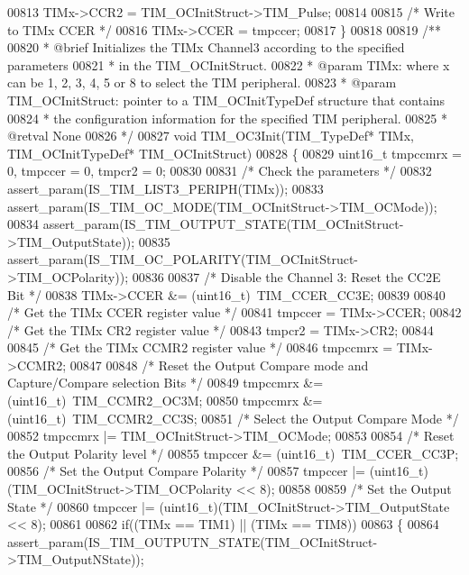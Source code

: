 \begin{DoxyCode}
00813   TIMx->CCR2 = TIM\_OCInitStruct->TIM\_Pulse;
00814 
00815   \textcolor{comment}{/* Write to TIMx CCER */}
00816   TIMx->CCER = tmpccer;
00817 \}
00818 
00819 \textcolor{comment}{/**}
00820 \textcolor{comment}{  * @brief  Initializes the TIMx Channel3 according to the specified parameters}
00821 \textcolor{comment}{  *         in the TIM\_OCInitStruct.}
00822 \textcolor{comment}{  * @param  TIMx: where x can be 1, 2, 3, 4, 5 or 8 to select the TIM peripheral.}
00823 \textcolor{comment}{  * @param  TIM\_OCInitStruct: pointer to a TIM\_OCInitTypeDef structure that contains}
00824 \textcolor{comment}{  *         the configuration information for the specified TIM peripheral.}
00825 \textcolor{comment}{  * @retval None}
00826 \textcolor{comment}{  */}
00827 \textcolor{keywordtype}{void} TIM_OC3Init(TIM\_TypeDef* TIMx, TIM\_OCInitTypeDef* TIM\_OCInitStruct)
00828 \{
00829   uint16\_t tmpccmrx = 0, tmpccer = 0, tmpcr2 = 0;
00830 
00831   \textcolor{comment}{/* Check the parameters */}
00832   assert_param(IS\_TIM\_LIST3\_PERIPH(TIMx));
00833   assert_param(IS\_TIM\_OC\_MODE(TIM\_OCInitStruct->TIM\_OCMode));
00834   assert_param(IS\_TIM\_OUTPUT\_STATE(TIM\_OCInitStruct->TIM\_OutputState));
00835   assert_param(IS\_TIM\_OC\_POLARITY(TIM\_OCInitStruct->TIM\_OCPolarity));
00836 
00837   \textcolor{comment}{/* Disable the Channel 3: Reset the CC2E Bit */}
00838   TIMx->CCER &= (uint16\_t)~TIM_CCER_CC3E;
00839 
00840   \textcolor{comment}{/* Get the TIMx CCER register value */}
00841   tmpccer = TIMx->CCER;
00842   \textcolor{comment}{/* Get the TIMx CR2 register value */}
00843   tmpcr2 =  TIMx->CR2;
00844 
00845   \textcolor{comment}{/* Get the TIMx CCMR2 register value */}
00846   tmpccmrx = TIMx->CCMR2;
00847 
00848   \textcolor{comment}{/* Reset the Output Compare mode and Capture/Compare selection Bits */}
00849   tmpccmrx &= (uint16\_t)~TIM_CCMR2_OC3M;
00850   tmpccmrx &= (uint16\_t)~TIM_CCMR2_CC3S;
00851   \textcolor{comment}{/* Select the Output Compare Mode */}
00852   tmpccmrx |= TIM\_OCInitStruct->TIM_OCMode;
00853 
00854   \textcolor{comment}{/* Reset the Output Polarity level */}
00855   tmpccer &= (uint16\_t)~TIM_CCER_CC3P;
00856   \textcolor{comment}{/* Set the Output Compare Polarity */}
00857   tmpccer |= (uint16\_t)(TIM\_OCInitStruct->TIM_OCPolarity << 8);
00858 
00859   \textcolor{comment}{/* Set the Output State */}
00860   tmpccer |= (uint16\_t)(TIM\_OCInitStruct->TIM_OutputState << 8);
00861 
00862   \textcolor{keywordflow}{if}((TIMx == TIM1) || (TIMx == TIM8))
00863   \{
00864     assert_param(IS\_TIM\_OUTPUTN\_STATE(TIM\_OCInitStruct->TIM\_OutputNState));

\end{DoxyCode}
